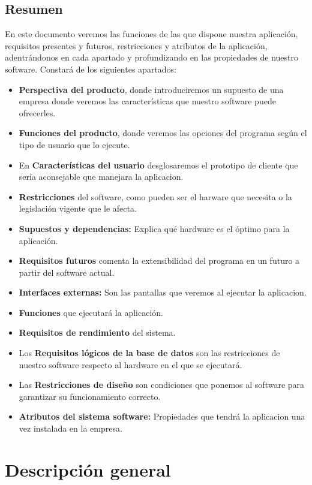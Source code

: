 \documentclass[spanish,a4paper,12pt]{report}		%
\begin{document}
\subsection{Resumen}

En este documento veremos las funciones de las que dispone nuestra aplicación, requisitos presentes y futuros, restricciones y atributos de la aplicación, adentrándonos en cada apartado y profundizando en las propiedades de nuestro software.
Constará de los siguientes apartados:
	\begin{itemize}
		\item \textbf{Perspectiva del producto}, donde introduciremos un supuesto de una empresa donde veremos las características que nuestro software puede ofrecerles.
		\item \textbf{Funciones del producto}, donde veremos las opciones del programa según el tipo de usuario que lo ejecute.
		\item En \textbf{Características del usuario} desglosaremos el prototipo de cliente que sería aconsejable que manejara la aplicacion.
		\item \textbf{Restricciones} del software, como pueden ser el harware que necesita o la legislación vigente que le afecta.
		\item \textbf{Supuestos y dependencias:} Explica qué hardware es el óptimo para la aplicación.
		\item \textbf{Requisitos futuros} comenta la extensibilidad del programa en un futuro a partir del software actual.
		\item \textbf{Interfaces externas:} Son las pantallas que veremos al ejecutar la aplicacion.
		\item \textbf{Funciones} que ejecutará la aplicación.
		\item \textbf{Requisitos de rendimiento} del sistema.
		\item Los \textbf{Requisitos lógicos de la base de datos} son las restricciones de nuestro software respecto al hardware en el que se ejecutará.
		\item Las \textbf{Restricciones de diseño} son condiciones que ponemos al software para garantizar su funcionamiento correcto.
		\item \textbf{Atributos del sistema software:} Propiedades que tendrá la aplicacion una vez instalada en la empresa.
	\end{itemize}


\section{Descripción general}
\end{document}
